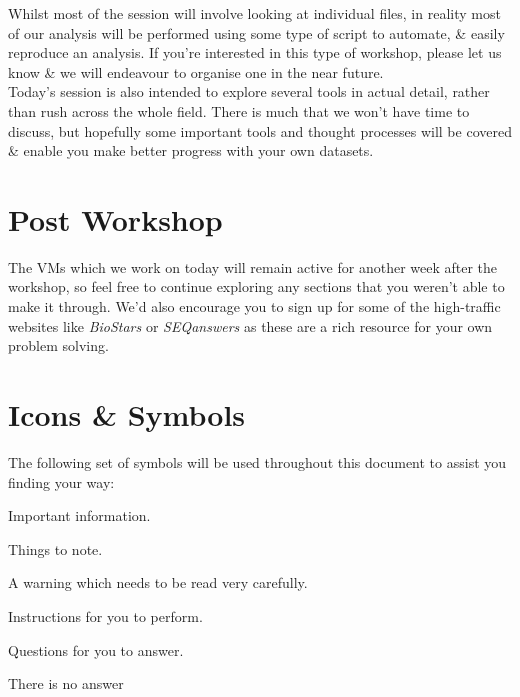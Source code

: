 Whilst most of the session will involve looking at individual files, in reality most of our analysis will be performed using some type of script to automate, \& easily reproduce an analysis.
If you're interested in this type of workshop, please let us know \& we will endeavour to organise one in the near future. \\

Today's session is also intended to explore several tools in actual detail, rather than rush across the whole field.
There is much that we won't have time to discuss, but hopefully some important tools and thought processes will be covered \& enable you make better progress with your own datasets.

\section{Post Workshop}
The VMs which we work on today will remain active for another week after the workshop, so feel free to continue exploring any sections that you weren't able to make it through.
We'd also encourage you to sign up for some of the high-traffic websites like \textit{BioStars} or \textit{SEQanswers} as these are a rich resource for your own problem solving.


\section{Icons \& Symbols}
The following set of symbols will be used throughout this document to assist you finding your way: \\

\begin{information}
Important information.\\
\end{information}

\begin{note}
Things to note.\\
\end{note}

\begin{warning}
A warning which needs to be read very carefully.\\
\end{warning}

\begin{steps}
Instructions for you to perform. \\
\end{steps}

\begin{questions}
Questions for you to answer. \\
\begin{answer}
There is no answer
\end{answer}
\end{questions}


